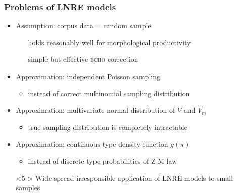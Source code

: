 \documentclass[t]{beamer} %
\begin{document}
\begin{frame}
  \frametitle{Problems of LNRE models}

  \ungap[1]
  \begin{itemize}
  \item Assumption: corpus data = random sample
    \begin{itemize}
    \item[\hand] holds reasonably well for morphological productivity
    \item[\hand] simple but effective \textsc{echo} correction \citep{Baroni:Evert:07a}
    \item[]
    \end{itemize}
  \item<2-> Approximation: independent Poisson sampling
    \begin{itemize}
    \item instead of correct multinomial sampling distribution
    \item[]
    \end{itemize}
  \item<3-> Approximation: multivariate normal distribution of $V$ and $V_m$
    \begin{itemize}
    \item true sampling distribution is completely intractable
    \item[]
    \end{itemize}
  \item<4-> Approximation: continuous type density function $g(\pi)$
    \begin{itemize}
    \item instead of discrete type probabilities of Z-M law
    \item[]
    \end{itemize}
  \item[\So]<5-> Wide-spread irresponsible application of LNRE models to small samples \citep[e.g.][]{Luedeling:Evert:05}
  \end{itemize}
\end{frame}
\end{document}
